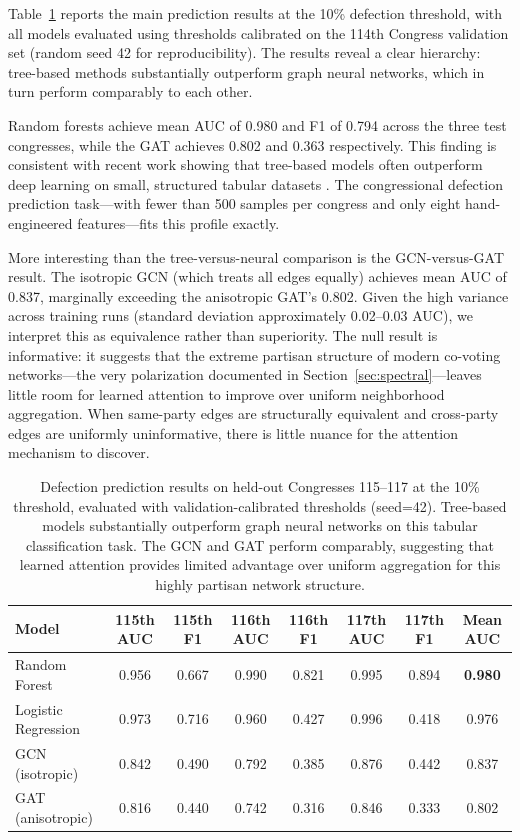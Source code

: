 \documentclass[11pt]{article}
\begin{document}
Table~\ref{tab:model_comparison} reports the main prediction results at the 10\% defection threshold, with all models evaluated using thresholds calibrated on the 114th Congress validation set (random seed 42 for reproducibility). The results reveal a clear hierarchy: tree-based methods substantially outperform graph neural networks, which in turn perform comparably to each other.

Random forests achieve mean AUC of 0.980 and F1 of 0.794 across the three test congresses, while the GAT achieves 0.802 and 0.363 respectively. This finding is consistent with recent work showing that tree-based models often outperform deep learning on small, structured tabular datasets \citep{grinsztajn2022tree}. The congressional defection prediction task---with fewer than 500 samples per congress and only eight hand-engineered features---fits this profile exactly.

More interesting than the tree-versus-neural comparison is the GCN-versus-GAT result. The isotropic GCN (which treats all edges equally) achieves mean AUC of 0.837, marginally exceeding the anisotropic GAT's 0.802. Given the high variance across training runs (standard deviation approximately 0.02--0.03 AUC), we interpret this as equivalence rather than superiority. The null result is informative: it suggests that the extreme partisan structure of modern co-voting networks---the very polarization documented in Section~\ref{sec:spectral}---leaves little room for learned attention to improve over uniform neighborhood aggregation. When same-party edges are structurally equivalent and cross-party edges are uniformly uninformative, there is little nuance for the attention mechanism to discover.

\begin{table}[H]
\centering
\caption{Defection prediction results on held-out Congresses 115--117 at the 10\% threshold, evaluated with validation-calibrated thresholds (seed=42). Tree-based models substantially outperform graph neural networks on this tabular classification task. The GCN and GAT perform comparably, suggesting that learned attention provides limited advantage over uniform aggregation for this highly partisan network structure.}
\label{tab:model_comparison}
\small
\begin{tabular}{lccccccc}
\toprule
Model & 115th AUC & 115th F1 & 116th AUC & 116th F1 & 117th AUC & 117th F1 & Mean AUC \\
\midrule
Random Forest & 0.956 & 0.667 & 0.990 & 0.821 & 0.995 & 0.894 & \textbf{0.980} \\
Logistic Regression & 0.973 & 0.716 & 0.960 & 0.427 & 0.996 & 0.418 & 0.976 \\
GCN (isotropic) & 0.842 & 0.490 & 0.792 & 0.385 & 0.876 & 0.442 & 0.837 \\
GAT (anisotropic) & 0.816 & 0.440 & 0.742 & 0.316 & 0.846 & 0.333 & 0.802 \\
\bottomrule
\end{tabular}
\end{table}
\end{document}
